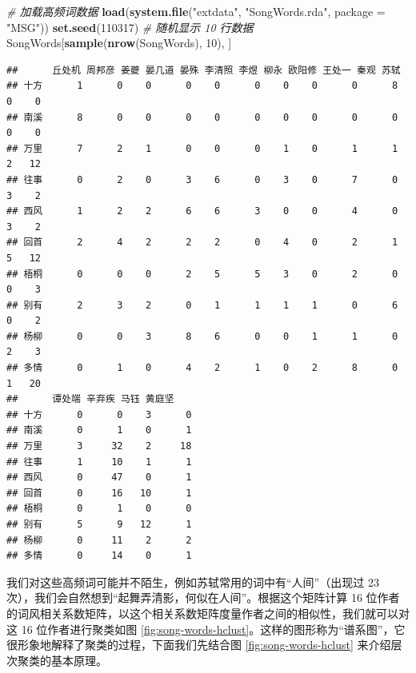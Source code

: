 \documentclass[
  b5paper,
  UTF8,twoside]{book}
\newenvironment{Shaded}{\begin{snugshade}}{\end{snugshade}}
\newcommand{\AttributeTok}[1]{\textcolor[rgb]{0.13,0.29,0.53}{#1}}
\newcommand{\CommentTok}[1]{\textcolor[rgb]{0.56,0.35,0.01}{\textit{#1}}}
\newcommand{\DecValTok}[1]{\textcolor[rgb]{0.00,0.00,0.81}{#1}}
\newcommand{\FunctionTok}[1]{\textcolor[rgb]{0.13,0.29,0.53}{\textbf{#1}}}
\newcommand{\NormalTok}[1]{#1}
\newcommand{\StringTok}[1]{\textcolor[rgb]{0.31,0.60,0.02}{#1}}
\begin{document}
\begin{Shaded}
\begin{Highlighting}[]
\CommentTok{\# 加载高频词数据}
\FunctionTok{load}\NormalTok{(}\FunctionTok{system.file}\NormalTok{(}\StringTok{"extdata"}\NormalTok{, }\StringTok{"SongWords.rda"}\NormalTok{, }\AttributeTok{package =} \StringTok{"MSG"}\NormalTok{))}
\FunctionTok{set.seed}\NormalTok{(}\DecValTok{110317}\NormalTok{) }\CommentTok{\# 随机显示 10 行数据}
\NormalTok{SongWords[}\FunctionTok{sample}\NormalTok{(}\FunctionTok{nrow}\NormalTok{(SongWords), }\DecValTok{10}\NormalTok{), ]}
\end{Highlighting}
\end{Shaded}

\begin{verbatim}
##      丘处机 周邦彦 姜夔 晏几道 晏殊 李清照 李煜 柳永 欧阳修 王处一 秦观 苏轼
## 十方      1      0    0      0    0      0    0    0      0      8    0    0
## 南溪      8      0    0      0    0      0    0    0      0      0    0    0
## 万里      7      2    1      0    0      0    1    0      1      1    2   12
## 往事      0      2    0      3    6      0    3    0      7      0    3    2
## 西风      1      2    2      6    6      3    0    0      4      0    3    2
## 回首      2      4    2      2    2      0    4    0      2      1    5   12
## 梧桐      0      0    0      2    5      5    3    0      2      0    0    3
## 别有      2      3    2      0    1      1    1    1      0      6    0    2
## 杨柳      0      0    3      8    6      0    0    1      1      0    2    3
## 多情      0      1    0      4    2      1    0    2      8      0    1   20
##      谭处端 辛弃疾 马钰 黄庭坚
## 十方      0      0    3      0
## 南溪      0      1    0      1
## 万里      3     32    2     18
## 往事      1     10    1      1
## 西风      0     47    0      1
## 回首      0     16   10      1
## 梧桐      0      1    0      0
## 别有      5      9   12      1
## 杨柳      0     11    2      2
## 多情      0     14    0      1
\end{verbatim}

我们对这些高频词可能并不陌生，例如苏轼常用的词中有``人间''（出现过 23 次），我们会自然想到``起舞弄清影，何似在人间''。根据这个矩阵计算 16 位作者的词风相关系数矩阵，以这个相关系数矩阵度量作者之间的相似性，我们就可以对这 16 位作者进行聚类如图 \ref{fig:song-words-hclust}。这样的图形称为``谱系图''，它很形象地解释了聚类的过程，下面我们先结合图 \ref{fig:song-words-hclust} 来介绍层次聚类的基本原理。
\end{document}

